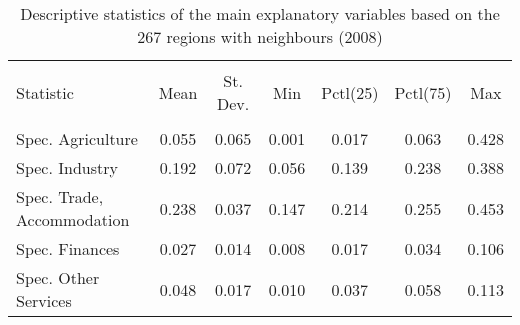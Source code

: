 \documentclass[11pt]{article}
\begin{document}
\begin{table}[!htbp] \centering 
  \caption{Descriptive statistics of the main explanatory variables based on the 267 regions with neighbours (2008)} 
  \label{descriptive_vars_filtered} 
\begin{tabular}{@{\extracolsep{5pt}}lcccccc} 
\\[-1.8ex]\hline 
\hline \\[-1.8ex] 
Statistic  & \multicolumn{1}{c}{Mean} & \multicolumn{1}{c}{St. Dev.} & \multicolumn{1}{c}{Min} & \multicolumn{1}{c}{Pctl(25)} & \multicolumn{1}{c}{Pctl(75)} & \multicolumn{1}{c}{Max} \\ 
\hline \\[-1.8ex] 
Spec. Agriculture & 0.055 & 0.065 & 0.001 & 0.017 & 0.063 & 0.428 \\ 
Spec. Industry  & 0.192 & 0.072 & 0.056 & 0.139 & 0.238 & 0.388 \\ 
Spec. Trade, Accommodation  & 0.238 & 0.037 & 0.147 & 0.214 & 0.255 & 0.453 \\ 
Spec. Finances  & 0.027 & 0.014 & 0.008 & 0.017 & 0.034 & 0.106 \\ 
Spec. Other Services & 0.048 & 0.017 & 0.010 & 0.037 & 0.058 & 0.113 \\ 

\end{tabular}
\end{table}
\end{document}
